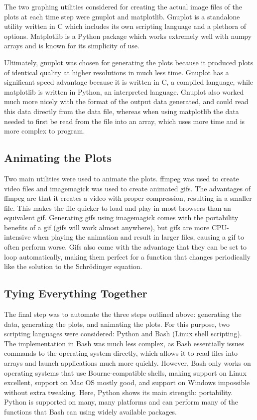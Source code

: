 \documentclass[11pt]{article}
\begin{document}
The two graphing utilities considered for creating the actual image files of the plots at each time step were gnuplot and matplotlib. Gnuplot is a standalone utility written in C which includes its own scripting language and a plethora of options. Matplotlib is a Python package which works extremely well with numpy arrays and is known for its simplicity of use.

Ultimately, gnuplot was chosen for generating the plots because it produced plots of identical quality at higher resolutions in much less time. Gnuplot has a significant speed advantage because it is written in C, a compiled language, while matplotlib is written in Python, an interpreted language. Gnuplot also worked much more nicely with the format of the output data generated, and could read this data directly from the data file, whereas when using matplotlib the data needed to first be read from the file into an array, which uses more time and is more complex to program.

\subsection{Animating the Plots}

Two main utilities were used to animate the plots. ffmpeg was used to create video files and imagemagick was used to create animated gifs. The advantages of ffmpeg are that it creates a video with proper compression, resulting in a smaller file. This makes the file quicker to load and play in most browsers than an equivalent gif. Generating gifs using imagemagick comes with the portability benefits of a gif (gifs will work almost anywhere), but gifs are more CPU-intensive when playing the animation and result in larger files, causing a gif to often perform worse. Gifs also come with the advantage that they can be set to loop automatically, making them perfect for a function that changes periodically like the solution to the Schr\"odinger equation.

\subsection{Tying Everything Together}

The final step was to automate the three steps outlined above: generating the data, generating the plots, and animating the plots. For this purpose, two scripting languages were considered: Python and Bash (Linux shell scripting). The implementation in Bash was much less complex, as Bash essentially issues commands to the operating system directly, which allows it to read files into arrays and launch applications much more quickly. However, Bash only works on operating systems that use Bourne-compatible shells, making support on Linux excellent, support on Mac OS mostly good, and support on Windows impossible without extra tweaking. Here, Python shows its main strength: portability. Python is supported on many, many platforms and can perform many of the functions that Bash can using widely available packages.
\end{document}
